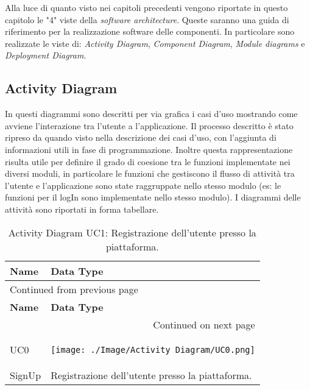 \documentclass[onecolumn,a4paper]{article}
\begin{document}
Alla luce di quanto visto nei capitoli precedenti vengono riportate in questo capitolo le "4" viste della \emph{software architecture}. Queste saranno una guida di riferimento per la realizzazione software delle componenti. In particolare sono realizzate le viste di: \emph{Activity Diagram}, \emph{Component Diagram}, \emph{Module diagrams} e \emph{Deployment Diagram}.

\subsection{Activity Diagram}
\label{sec:org2a8b338}
In questi diagrammi sono descritti per via grafica i casi d'uso mostrando come avviene l'interazione tra l'utente a l'applicazione. Il processo descritto è stato ripreso da quando visto nella descrizione dei casi d'uso, con l'aggiunta di informazioni utili in fase di programmazione. Inoltre questa rappresentazione risulta utile per definire il grado di coesione tra le funzioni implementate nei diversi moduli, in particolare le funzioni che gestiscono il flusso di attività tra l'utente e l'applicazione sono state raggruppate nello stesso modulo (es: le funzioni per il logIn sono implementate nello stesso modulo).
I diagrammi delle attività sono riportati in forma tabellare. 

\begin{longtable}{|p{2cm}|p{12cm}|}
\caption{Activity Diagram UC1: Registrazione dell'utente presso la piattaforma.}
\\
\cellcolor{grey!15} \textbf{Name} & \cellcolor{grey!15} \textbf{Data Type}\\
\hline
\endfirsthead
\multicolumn{2}{l}{Continued from previous page} \\
\hline

\cellcolor{grey!15} \textbf{Name} & \cellcolor{grey!15} \textbf{Data Type} \\

\hline
\endhead
\hline\multicolumn{2}{r}{Continued on next page} \\
\endfoot
\endlastfoot
\hline
UC0 & \begin{center}
\texttt{[image: ./Image/Activity Diagram/UC0.png]}
\end{center}\\
\hline
SignUp & Registrazione dell'utente presso la piattaforma.\\
\hline
\end{longtable}
\end{document}
